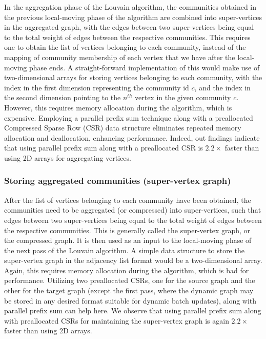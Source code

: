 In the aggregation phase of the Louvain algorithm, the communities obtained in the previous local-moving phase of the algorithm are combined into super-vertices in the aggregated graph, with the edges between two super-vertices being equal to the total weight of edges between the respective communities. This requires one to obtain the list of vertices belonging to each community, instead of the mapping of community membership of each vertex that we have after the local-moving phase ends. A straight-forward implementation of this would make use of two-dimensional arrays for storing vertices belonging to each community, with the index in the first dimension representing the community id $c$, and the index in the second dimension pointing to the $n^{th}$ vertex in the given community $c$. However, this requires memory allocation during the algorithm, which is expensive. Employing a parallel prefix sum technique along with a preallocated Compressed Sparse Row (CSR) data structure eliminates repeated memory allocation and deallocation, enhancing performance. Indeed, out findings indicate that using parallel prefix sum along with a preallocated CSR is $2.2\times$ faster than using 2D arrays for aggregating vertices.


\subsubsection{Storing aggregated communities (super-vertex graph)}

After the list of vertices belonging to each community have been obtained, the communities need to be aggregated (or compressed) into super-vertices, such that edges between two super-vertices being equal to the total weight of edges between the respective communities. This is generally called the super-vertex graph, or the compressed graph. It is then used as an input to the local-moving phase of the next pass of the Louvain algorithm. A simple data structure to store the super-vertex graph in the adjacency list format would be a two-dimensional array. Again, this requires memory allocation during the algorithm, which is bad for performance. Utilizing two preallocated CSRs, one for the source graph and the other for the target graph (except the first pass, where the dynamic graph may be stored in any desired format suitable for dynamic batch updates), along with parallel prefix sum can help here. We observe that using parallel prefix sum along with preallocated CSRs for maintaining the super-vertex graph is again $2.2\times$ faster than using 2D arrays.


